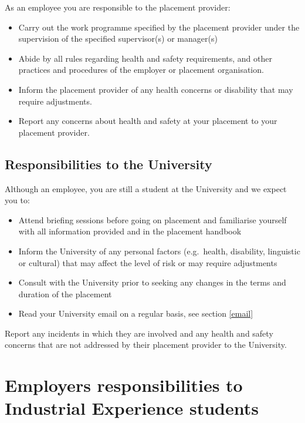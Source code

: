 \documentclass[
]{book}
\providecommand{\tightlist}{%
  \setlength{\itemsep}{0pt}\setlength{\parskip}{0pt}}
\begin{document}
As an employee you are responsible to the placement provider:

\begin{itemize}
\tightlist
\item
  Carry out the work programme specified by the placement provider under the supervision of the specified supervisor(s) or manager(s)
\item
  Abide by all rules regarding health and safety requirements, and other practices and procedures of the employer or placement organisation.
\item
  Inform the placement provider of any health concerns or disability that may require adjustments.
\item
  Report any concerns about health and safety at your placement to your placement provider.
\end{itemize}

\section{Responsibilities to the University}\label{runi}

Although an employee, you are still a student at the University and we expect you to:

\begin{itemize}
\tightlist
\item
  Attend briefing sessions before going on placement and familiarise yourself with all information provided and in the placement handbook
\item
  Inform the University of any personal factors (e.g.~health, disability, linguistic or cultural) that may affect the level of risk or may require adjustments
\item
  Consult with the University prior to seeking any changes in the terms and duration of the placement
\item
  Read your University email on a regular basis, see section \ref{email}
\end{itemize}

Report any incidents in which they are involved and any health and safety concerns that are not addressed by their placement provider to the University.

\chapter{Employers responsibilities to Industrial Experience students}\label{employers}
\end{document}
